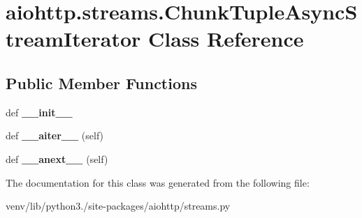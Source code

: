 \hypertarget{classaiohttp_1_1streams_1_1_chunk_tuple_async_stream_iterator}{}\section{aiohttp.\+streams.\+Chunk\+Tuple\+Async\+Stream\+Iterator Class Reference}
\label{classaiohttp_1_1streams_1_1_chunk_tuple_async_stream_iterator}
\subsection*{Public Member Functions}
\begin{DoxyCompactItemize}
\item 
\mbox{\label{classaiohttp_1_1streams_1_1_chunk_tuple_async_stream_iterator_a14dd1effcd5fe7200596413e2fef92eb}} 
def {\bfseries \+\_\+\+\_\+init\+\_\+\+\_\+}
\item 
\mbox{\label{classaiohttp_1_1streams_1_1_chunk_tuple_async_stream_iterator_a5245ddf7f36bbfb3c53addec02461817}} 
def {\bfseries \+\_\+\+\_\+aiter\+\_\+\+\_\+} (self)
\item 
\mbox{\label{classaiohttp_1_1streams_1_1_chunk_tuple_async_stream_iterator_a303dec74c2fbf756f5b2f576f79cc2ca}} 
def {\bfseries \+\_\+\+\_\+anext\+\_\+\+\_\+} (self)
\end{DoxyCompactItemize}


The documentation for this class was generated from the following file\+:\begin{DoxyCompactItemize}
\item 
venv/lib/python3./site-\/packages/aiohttp/streams.\+py\end{DoxyCompactItemize}
